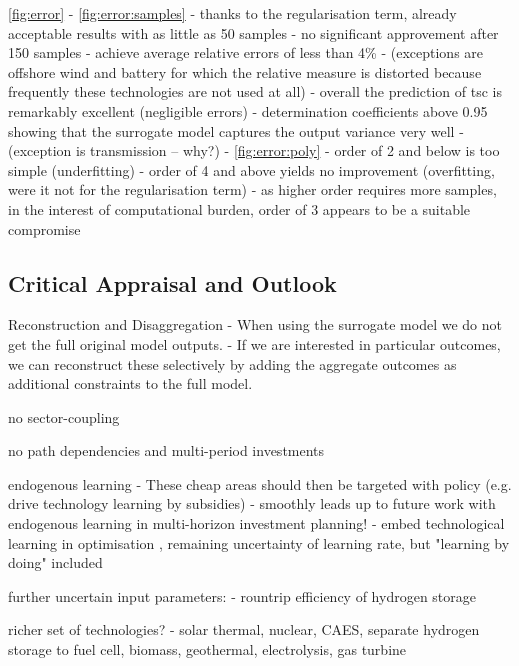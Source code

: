 \cref{fig:error}
- \cref{fig:error:samples}
  - thanks to the regularisation term, already acceptable results with as little as 50 samples
  - no significant approvement after 150 samples
  - achieve average relative errors of less than 4\%
  - (exceptions are offshore wind and battery for which the relative measure is distorted because frequently these technologies are not used at all)
  - overall the prediction of tsc is remarkably excellent (negligible errors)
  - determination coefficients above 0.95 showing that the surrogate model captures the output variance very well
  - (exception is transmission -- why?)
- \cref{fig:error:poly}
  - order of 2 and below is too simple (underfitting)
  - order of 4 and above yields no improvement (overfitting, were it not for the regularisation term)
  - as higher order requires more samples, in the interest of computational burden, order of 3 appears to be a suitable compromise

\subsection{Critical Appraisal and Outlook}

Reconstruction and Disaggregation
- When using the surrogate model we do not get the full original model outputs.
- If we are interested in particular outcomes, we can reconstruct these selectively
by adding the aggregate outcomes as additional constraints to the full model.

no sector-coupling

no path dependencies and multi-period investments

endogenous learning
- These cheap areas should then be targeted with policy (e.g. drive technology learning by subsidies)
- smoothly leads up to future work with endogenous learning in multi-horizon investment planning!
- embed technological learning in optimisation \cite{heuberger_power_2017} \cite{lopion_cost_2019}, remaining uncertainty of learning rate, but "learning by doing" included

further uncertain input parameters:
- rountrip efficiency of hydrogen storage

richer set of technologies?
- solar thermal, nuclear, CAES, separate hydrogen storage to fuel cell, biomass, geothermal, electrolysis, gas turbine
